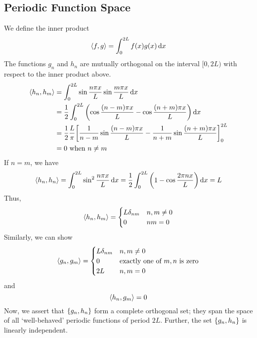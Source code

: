 \subsection{Periodic Function Space}
We define the inner product
\[
	\left\langle{f, g}\right\rangle = \int_0^{2L} f(x) g(x) \dd{x}
\]
The functions \( g_n \) and \( h_n \) are mutually orthogonal on the interval \( [0, 2L) \) with respect to the inner product above.
\begin{align*}
	\left\langle{h_n, h_m}\right\rangle & = \int_0^{2L} \sin \frac{n\pi x}{L} \sin \frac{m\pi x}{L} \dd{x}                                                           \\
	                 & = \frac{1}{2} \int_0^{2L} \qty(\cos\frac{(n-m)\pi x}{L} - \cos \frac{(n+m)\pi x}{L}) \dd{x}                                \\
	                 & = \frac{1}{2} \frac{L}{\pi} \qty[ \frac{1}{n-m}\sin\frac{(n-m)\pi x}{L} - \frac{1}{n+m} \sin \frac{(n+m)\pi x}{L} ]_0^{2L} \\
	                 & = 0 \text{ when } n \neq m
\end{align*}
If \( n = m \), we have
\[
	\left\langle{h_n, h_n}\right\rangle = \int_0^{2L} \sin^2 \frac{n\pi x}{L} \dd{x} = \frac{1}{2} \int_0^{2L} \qty(1-\cos \frac{2\pi n x}{L}) \dd{x} = L
\]
Thus,
\[
	\left\langle{h_n, h_m}\right\rangle = \begin{cases}
		L \delta_{nm} & n,m \neq 0 \\
		0             & nm = 0
	\end{cases}
\]
Similarly, we can show
\[
	\left\langle{g_n, g_m}\right\rangle = \begin{cases}
		L \delta_{nm} & n,m \neq 0                                 \\
		0             & \text{exactly one of } m,n \text{ is zero} \\
		2L            & n,m = 0
	\end{cases}
\]
and
\[
	\left\langle{h_n, g_m}\right\rangle = 0
\]
Now, we assert that \( \qty{g_n, h_n} \) form a complete orthogonal set; they span the space of all `well-behaved' periodic functions of period \( 2L \).
Further, the set \( \qty{g_n, h_n} \) is linearly independent.

